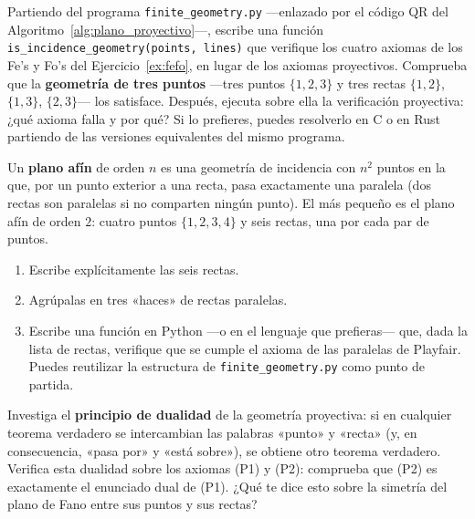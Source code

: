 \begin{exercise}
    Partiendo del programa \texttt{finite\_geometry.py} —enlazado por el código QR del
    Algoritmo~\ref{alg:plano_proyectivo}—, escribe una función \texttt{is\_incidence\_geometry(points, lines)} que
    verifique los cuatro axiomas de los Fe's y Fo's del Ejercicio~\ref{ex:fefo}, en lugar de los axiomas proyectivos.
    Comprueba que la \textbf{geometría de tres puntos} —tres puntos $\{1,2,3\}$ y tres rectas $\{1,2\}$, $\{1,3\}$,
    $\{2,3\}$— los satisface. Después, ejecuta sobre ella la verificación proyectiva: ¿qué axioma falla y por qué?
    Si lo prefieres, puedes resolverlo en C o en Rust partiendo de las versiones equivalentes del mismo programa.
\end{exercise}

\begin{exercise}
    Un \textbf{plano afín} de orden $n$ es una geometría de incidencia con $n^2$ puntos en la que, por un punto exterior
    a una recta, pasa exactamente una paralela (dos rectas son paralelas si no comparten ningún punto). El más pequeño
    es el plano afín de orden $2$: cuatro puntos $\{1,2,3,4\}$ y seis rectas, una por cada par de puntos.
    \begin{enumerate}
        \item[(a)] Escribe explícitamente las seis rectas.
        \item[(b)] Agrúpalas en tres «haces» de rectas paralelas.
        \item[(c)] Escribe una función en Python —o en el lenguaje que prefieras— que, dada la lista de rectas,
              verifique que se cumple el axioma de las paralelas de Playfair. Puedes reutilizar la estructura de
              \texttt{finite\_geometry.py} como punto de partida.
    \end{enumerate}
\end{exercise}

\begin{exercise}
    Investiga el \textbf{principio de dualidad} de la geometría proyectiva: si en cualquier teorema verdadero se
    intercambian las palabras «punto» y «recta» (y, en consecuencia, «pasa por» y «está sobre»), se obtiene otro
    teorema verdadero. Verifica esta dualidad sobre los axiomas (P1) y (P2): comprueba que (P2) es exactamente el
    enunciado dual de (P1). ¿Qué te dice esto sobre la simetría del plano de Fano entre sus puntos y sus rectas?
\end{exercise}